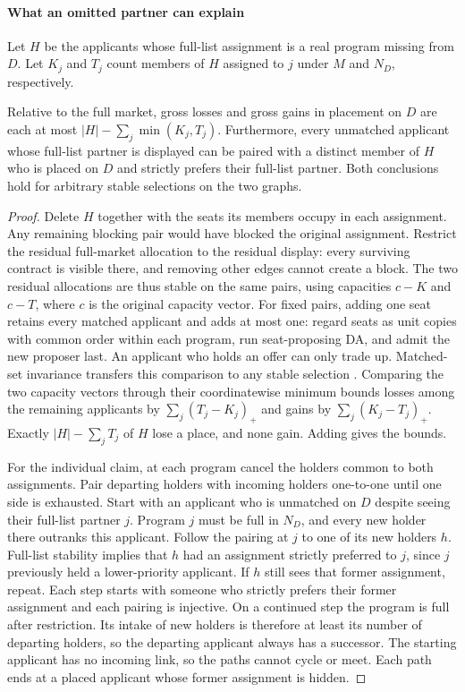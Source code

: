 \paragraph{What an omitted partner can explain}
Let $H$ be the applicants whose full-list assignment is a real program missing from $D$. Let $K_j$ and $T_j$ count members of $H$ assigned to $j$ under $M$ and $N_D$, respectively.
\begin{theorem}\label{thm:two-omission}
Relative to the full market, gross losses and gross gains in placement on $D$ are each at most $|H|-\sum_j\min(K_j,T_j)$. Furthermore, every unmatched applicant whose full-list partner is displayed can be paired with a distinct member of $H$ who is placed on $D$ and strictly prefers their full-list partner. Both conclusions hold for arbitrary stable selections on the two graphs.
\end{theorem}
\begin{proof}
Delete $H$ together with the seats its members occupy in each assignment. Any remaining blocking pair would have blocked the original assignment. Restrict the residual full-market allocation to the residual display: every surviving contract is visible there, and removing other edges cannot create a block. The two residual allocations are thus stable on the same pairs, using capacities $c-K$ and $c-T$, where $c$ is the original capacity vector. For fixed pairs, adding one seat retains every matched applicant and adds at most one: regard seats as unit copies with common order within each program, run seat-proposing DA, and admit the new proposer last. An applicant who holds an offer can only trade up. Matched-set invariance transfers this comparison to any stable selection \citep{galesoto,roth1986,crawford1991}. Comparing the two capacity vectors through their coordinatewise minimum bounds losses among the remaining applicants by $\sum_j(T_j-K_j)_+$ and gains by $\sum_j(K_j-T_j)_+$. Exactly $|H|-\sum_jT_j$ of $H$ lose a place, and none gain. Adding gives the bounds.

For the individual claim, at each program cancel the holders common to both assignments. Pair departing holders with incoming holders one-to-one until one side is exhausted. Start with an applicant who is unmatched on $D$ despite seeing their full-list partner $j$. Program $j$ must be full in $N_D$, and every new holder there outranks this applicant. Follow the pairing at $j$ to one of its new holders $h$. Full-list stability implies that $h$ had an assignment strictly preferred to $j$, since $j$ previously held a lower-priority applicant. If $h$ still sees that former assignment, repeat. Each step starts with someone who strictly prefers their former assignment and each pairing is injective. On a continued step the program is full after restriction. Its intake of new holders is therefore at least its number of departing holders, so the departing applicant always has a successor. The starting applicant has no incoming link, so the paths cannot cycle or meet. Each path ends at a placed applicant whose former assignment is hidden.
\end{proof}

